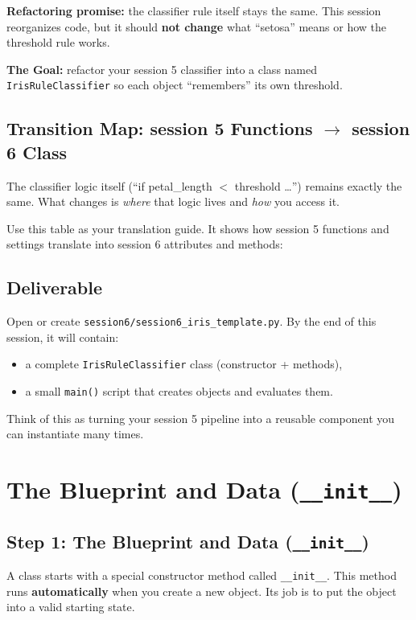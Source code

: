 \noindent
\textbf{Refactoring promise:} the classifier rule itself stays the same.
This session reorganizes code, but it should \textbf{not change} what ``setosa'' means or how the threshold rule works.

\noindent
\textbf{The Goal:} refactor your session 5 classifier into a class named \texttt{IrisRuleClassifier} so each object ``remembers'' its own threshold.

\subsection{Transition Map: session 5 Functions $\rightarrow$ session 6 Class}
The classifier logic itself (``if petal\_length $<$ threshold \dots'') remains exactly the same.
What changes is \textit{where} that logic lives and \textit{how} you access it.

\noindent
Use this table as your translation guide. It shows how session 5 functions and settings translate into session 6 attributes and methods:



\subsection{Deliverable}
Open or create \texttt{session6/session6\_iris\_template.py}.
By the end of this session, it will contain:
\begin{itemize}\setlength{\itemsep}{2pt}
    \item a complete \texttt{IrisRuleClassifier} class (constructor + methods),
    \item a small \texttt{main()} script that creates objects and evaluates them.
\end{itemize}
\noindent
Think of this as turning your session 5 pipeline into a reusable component you can instantiate many times.


\section{The Blueprint and Data (\texttt{\_\_init\_\_})}

\subsection{Step 1: The Blueprint and Data (\texttt{\_\_init\_\_})}
A class starts with a special constructor method called \texttt{\_\_init\_\_}.
This method runs \textbf{automatically} when you create a new object.
Its job is to put the object into a valid starting state.

